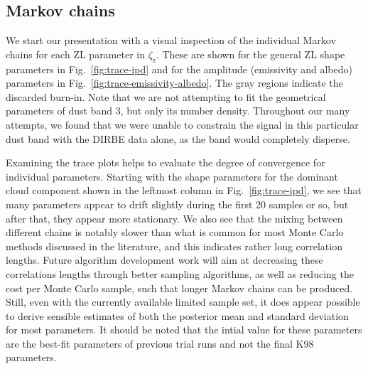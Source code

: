 \documentclass[twocolumn]{aa}
\begin{document}
\subsection{Markov chains}

We start our presentation with a visual inspection of the individual
Markov chains for each ZL parameter in $\zeta_{\mathrm{z}}$. These
are shown for the general ZL shape parameters in
Fig.~\ref{fig:trace-ipd} and for the amplitude (emissivity and albedo)
parameters in Fig.~\ref{fig:trace-emissivity-albedo}. The gray regions
indicate the discarded burn-in.
Note that we are not attempting to fit the geometrical parameters of dust band 3, but only its number density. 
Throughout our many attempts, we found that we were unable to constrain the signal in this particular dust band with the DIRBE data alone, 
as the band would completely disperse.

Examining the trace plots helps to evaluate the degree of convergence for individual parameters. Starting
with the shape parameters for the dominant cloud component shown in
the leftmost column in Fig.~\ref{fig:trace-ipd}, we see that many
parameters appear to drift slightly during the first 20
samples or so, but after that, they appear more stationary. We also
see that the mixing between different chains is notably slower than
what is common for most Monte Carlo methods discussed in the
literature, and this indicates rather long correlation lengths. Future
algorithm development work will aim at decreasing
these correlations lengths through better sampling algorithms, as well
as reducing the cost per Monte Carlo sample, such that longer Markov
chains can be produced. Still, even with the currently available
limited sample set, it does appear possible to derive sensible
estimates of both the posterior mean and standard deviation for most
parameters. It should be noted that the intial value for these parameters are the best-fit parameters of previous trial runs and not the final K98 parameters.
\end{document}
